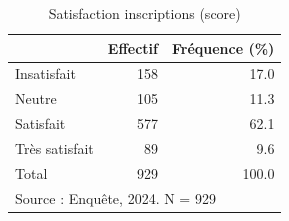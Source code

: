 \begin{table}[htbp]\centering
\def\sym#1{\ifmmode^{#1}\else\(^{#1}\)\fi}
\caption{Satisfaction inscriptions (score)}
\begin{tabular}{l*{2}{r}}
\toprule
            &    Effectif&Fréquence (\%)\\
\midrule
Insatisfait &         158&        17.0\\
Neutre      &         105&        11.3\\
Satisfait   &         577&        62.1\\
Très satisfait&          89&         9.6\\
Total       &         929&       100.0\\
\bottomrule
\multicolumn{3}{l}{\footnotesize Source : Enquête, 2024. N = 929}\\
\end{tabular}
\end{table}
